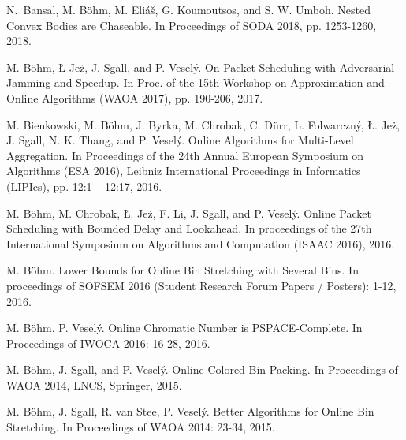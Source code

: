 \renewcommand\bibname{Papers in conference proceedings}
\begin{thebibliography}{99}
\setlength\itemsep{0pt}

N.~Bansal, M. Böhm, M. Eliáš, G. Koumoutsos, and S. W. Umboh.
\newblock Nested Convex Bodies are Chaseable.
\newblock In Proceedings of SODA 2018, pp. 1253-1260, 2018.

M. Böhm, Ł Jeż, J. Sgall, and P. Veselý.
\newblock On Packet Scheduling with Adversarial Jamming and Speedup.
\newblock In Proc. of the 15th Workshop on Approximation and Online Algorithms (WAOA 2017), pp. 190-206, 2017.

M. Bienkowski, M. Böhm, J. Byrka, M. Chrobak, C. Dürr, L. Folwarczný, Ł. Jeż, J. Sgall, N. K. Thang, and P. Veselý.
\newblock Online Algorithms for Multi-Level Aggregation.
\newblock In Proceedings of the 24th Annual European Symposium on Algorithms (ESA 2016), Leibniz International Proceedings in Informatics (LIPIcs), pp. 12:1 -- 12:17, 2016.

M. Böhm, M. Chrobak, Ł. Jeż, F. Li, J. Sgall, and P. Veselý.
\newblock Online Packet Scheduling with Bounded Delay and Lookahead.
\newblock In proceedings of the 27th International Symposium on Algorithms and Computation (ISAAC 2016), 2016.

M. Böhm.
\newblock Lower Bounds for Online Bin Stretching with Several Bins.
\newblock In proceedings of SOFSEM 2016 (Student Research Forum Papers / Posters): 1-12, 2016.

M. Böhm, P. Veselý.
\newblock Online Chromatic Number is PSPACE-Complete.
\newblock In Proceedings of IWOCA 2016: 16-28, 2016.

M. Böhm, J. Sgall, and P. Veselý.
\newblock Online Colored Bin Packing.
\newblock In Proceedings of WAOA 2014, LNCS, Springer, 2015.

M. Böhm, J. Sgall, R. van Stee, P. Veselý.
\newblock Better Algorithms for Online Bin Stretching.
\newblock In Proceedings of WAOA 2014: 23-34, 2015.

\end{thebibliography}

\endgroup
